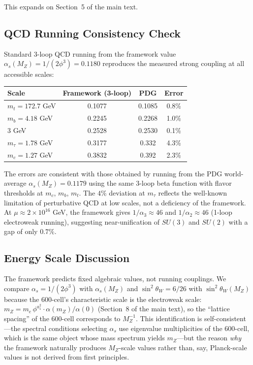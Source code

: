 \documentclass[12pt,a4paper]{article}
\theoremstyle{definition}
\begin{document}
This expands on Section~5 of the main text.

\subsection{QCD Running Consistency Check}

Standard 3-loop QCD running from the framework value $\alpha_s(M_Z) = 1/(2\phi^3) = 0.1180$ reproduces the measured strong coupling at all accessible scales:

\begin{center}
\begin{tabular}{lccc}
\toprule
\textbf{Scale} & \textbf{Framework (3-loop)} & \textbf{PDG} & \textbf{Error} \\
\midrule
$m_t = 172.7$ GeV & 0.1077 & 0.1085 & 0.8\% \\
$m_b = 4.18$ GeV  & 0.2245 & 0.2268 & 1.0\% \\
$3$ GeV           & 0.2528 & 0.2530 & 0.1\% \\
$m_\tau = 1.78$ GeV & 0.3177 & 0.332 & 4.3\% \\
$m_c = 1.27$ GeV  & 0.3832 & 0.392  & 2.3\% \\
\bottomrule
\end{tabular}
\end{center}

\noindent The errors are consistent with those obtained by running from the PDG world-average $\alpha_s(M_Z) = 0.1179$ using the same 3-loop beta function with flavor thresholds at $m_c$, $m_b$, $m_t$. The $4\%$ deviation at $m_\tau$ reflects the well-known limitation of perturbative QCD at low scales, not a deficiency of the framework. At $\mu \approx 2 \times 10^{16}$ GeV, the framework gives $1/\alpha_3 \approx 46$ and $1/\alpha_2 \approx 46$ (1-loop electroweak running), suggesting near-unification of $SU(3)$ and $SU(2)$ with a gap of only $0.7\%$.

\subsection{Energy Scale Discussion}

The framework predicts fixed algebraic values, not running couplings. We compare $\alpha_s = 1/(2\phi^3)$ with $\alpha_s(M_Z)$ and $\sin^2\theta_W = 6/26$ with $\sin^2\theta_W(M_Z)$ because the 600-cell's characteristic scale is the electroweak scale: $m_Z = m_e\,\phi^{a_1^2} \cdot \alpha(m_Z)/\alpha(0)$ (Section~8 of the main text), so the ``lattice spacing'' of the 600-cell corresponds to $M_Z^{-1}$. This identification is self-consistent---the spectral conditions selecting $\alpha_s$ use eigenvalue multiplicities of the 600-cell, which is the same object whose mass spectrum yields $m_Z$---but the reason \emph{why} the framework naturally produces $M_Z$-scale values rather than, say, Planck-scale values is not derived from first principles.
\end{document}
